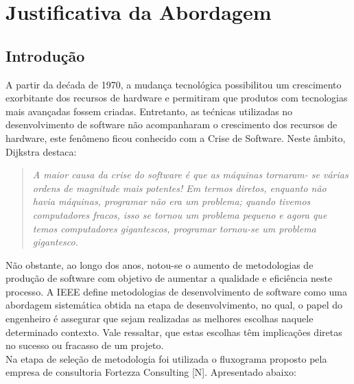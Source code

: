 
\chapter[Justificativa da Abordagem]{Justificativa da Abordagem}

{\large {\section { Introdução \\ } } }

\tab A partir da dećada de 1970, a mudança tecnológica  possibilitou um crescimento exorbitante dos recursos de hardware e permitiram que produtos com tecnologias mais avançadas fossem criadas. Entretanto, as tećnicas utilizadas no desenvolvimento  de software não acompanharam o crescimento dos recursos de hardware, este fenômeno ficou conhecido com a Crise de Software. Neste âmbito, Dijkstra destaca:\\

\begin{quote}
	\textsl
	{
		A maior causa da crise do software é que as máquinas tornaram-
		se várias ordens de magnitude mais potentes! Em termos diretos,
		enquanto não havia máquinas, programar não era um problema;
		quando tivemos computadores fracos, isso se tornou um problema
		pequeno e agora que temos computadores gigantescos, programar
		tornou-se um problema gigantesco.
	}
\end{quote}


\tab Não obstante,  ao longo dos anos, notou-se o aumento de metodologias de produção de software com objetivo de aumentar a qualidade e eficiência neste processo. A IEEE define metodologias de desenvolvimento de software como uma abordagem sistemática obtida na etapa de desenvolvimento, no qual, o papel do engenheiro é assegurar que sejam realizadas as melhores escolhas naquele determinado contexto. Vale ressaltar, que estas escolhas têm implicações diretas no sucesso ou fracasso de um projeto.\\

\tab Na etapa de seleção de metodologia foi utilizada o fluxograma proposto pela empresa de consultoria Fortezza Consulting [N]. Apresentado abaixo: \\


